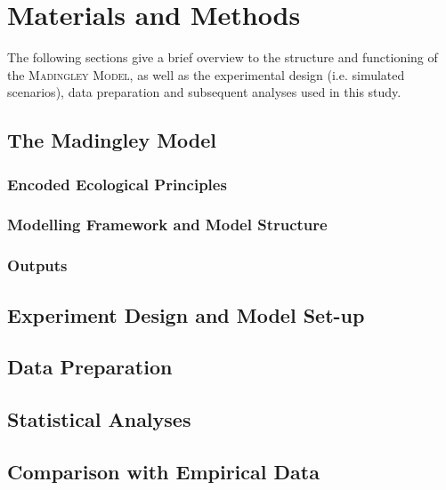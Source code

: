 \chapter{Materials and Methods}
\label{chap:mat}
The following sections give a brief overview to the    structure and functioning of the \textsc{Madingley Model}, as well as the experimental design (i.e. simulated scenarios), data preparation and subsequent analyses used in this study.
\section{The Madingley Model}
\label{chap:mat:madingley}

\subsection{Encoded Ecological Principles}
\label{chap:mat:madingley:princip}

\subsection{Modelling Framework and Model Structure}
\label{chap:mat:madingley:structure}

\subsection{Outputs}
\label{chap:mat:madingley:output}

\section{Experiment Design and Model Set-up}
\label{chap:mat:exp}

\section{Data Preparation}
\label{chap:mat:data}

\section{Statistical Analyses}
\label{chap:mat:stats}

\section{Comparison with Empirical Data}
\label{chap:mat:emp}

